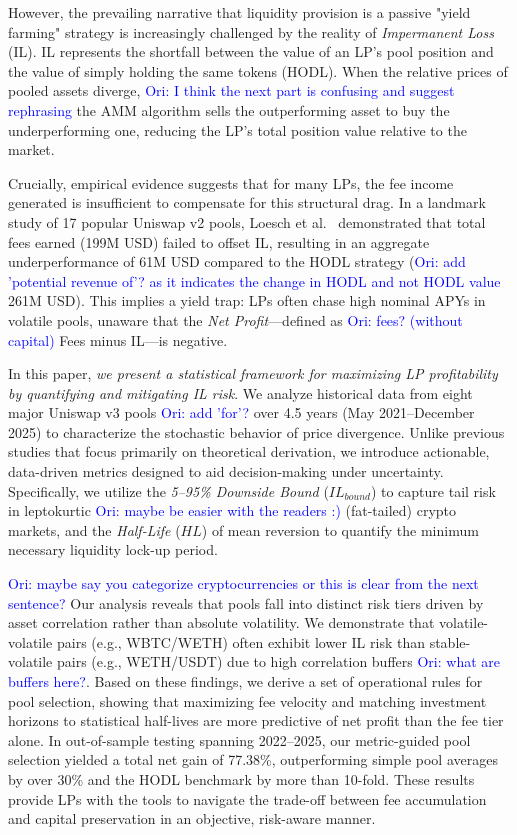 \documentclass[journal]{IEEEtran}
\newcommand{\ori}[1]{\textcolor{blue}{Ori: #1}}
\begin{document}
However, the prevailing narrative that liquidity provision is a passive "yield farming" strategy is increasingly challenged by the reality of \textit{Impermanent Loss} (IL). IL represents the shortfall between the value of an LP’s pool position and the value of simply holding the same tokens (HODL). When the relative prices of pooled assets diverge, \ori{I think the next part is confusing and suggest rephrasing} the AMM algorithm sells the outperforming asset to buy the underperforming one, reducing the LP's total position value relative to the market.

Crucially, empirical evidence suggests that for many LPs, the fee income generated is insufficient to compensate for this structural drag. In a landmark study of 17 popular Uniswap v2 pools, Loesch et al.~\cite{loesch2021impermanent} demonstrated that total fees earned (199M USD) failed to offset IL, resulting in an aggregate underperformance of 61M USD compared to the HODL strategy (\ori{add 'potential revenue of'? as it indicates the change in HODL and not HODL value} 261M USD). This implies a yield trap: LPs often chase high nominal APYs in volatile pools, unaware that the \textit{Net Profit}—defined as \ori{fees? (without capital)} Fees minus IL—is negative.

In this paper, \textit{we present a statistical framework for maximizing LP profitability by quantifying and mitigating IL risk}. We analyze historical data from eight major Uniswap v3 pools \ori{add 'for'?} over 4.5 years (May 2021--December 2025) to characterize the stochastic behavior of price divergence. Unlike previous studies that focus primarily on theoretical derivation, we introduce actionable, data-driven metrics designed to aid decision-making under uncertainty. Specifically, we utilize the \textit{5–95\% Downside Bound} ($IL_{bound}$) to capture tail risk in leptokurtic \ori{maybe be easier with the readers :)} (fat-tailed) crypto markets, and the \textit{Half-Life} ($HL$) of mean reversion to quantify the minimum necessary liquidity lock-up period.

\ori{maybe say you categorize cryptocurrencies or this is clear from the next sentence?}
Our analysis reveals that pools fall into distinct risk tiers driven by asset correlation rather than absolute volatility. We demonstrate that volatile-volatile pairs (e.g., WBTC/WETH) often exhibit lower IL risk than stable-volatile pairs (e.g., WETH/USDT) due to high correlation buffers \ori{what are buffers here?}. Based on these findings, we derive a set of operational rules for pool selection, showing that maximizing fee velocity and matching investment horizons to statistical half-lives are more predictive of net profit than the fee tier alone.
In out-of-sample testing spanning 2022--2025, our metric-guided pool selection yielded a total net gain of 77.38\%, outperforming simple pool averages by over 30\% and the HODL benchmark by more than 10-fold. These results provide LPs with the tools to navigate the trade-off between fee accumulation and capital preservation in an objective, risk-aware manner.
\end{document}
